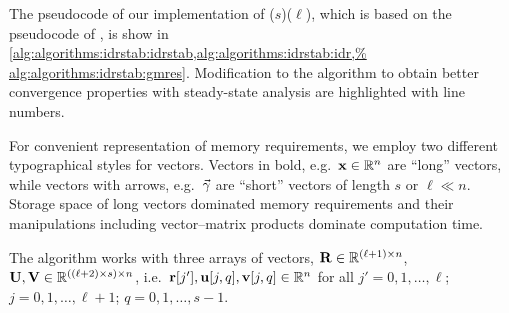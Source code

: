The pseudocode of our implementation of
($s$)($\ell$), which is based on the
pseudocode of \citet{sleijpen2010exploiting}, is show in
\cref{alg:algorithms:idrstab:idrstab,alg:algorithms:idrstab:idr,%
alg:algorithms:idrstab:gmres}. Modification to the algorithm to obtain
better convergence properties with  steady-state analysis
are highlighted with  line numbers.

For convenient representation of memory requirements, we employ two
different typographical styles for vectors. Vectors in bold,
e.g.~$\bm{\mathrm{x}} \in \mathbb{R}^n$ are ``long'' vectors, while vectors with
arrows, e.g.~$\vecarrow{\gamma}$ are ``short'' vectors of length $s$
or $\ell \ll n$. Storage space of long vectors dominated memory
requirements and their manipulations including vector--matrix products
dominate computation time.

The algorithm works with three arrays of vectors,
$\bm{\mathrm{R}} \in \mathbb{R}^{(\ell + 1) \times n}$,
$\bm{\mathrm{U}}, \bm{\mathrm{V}} \in \mathbb{R}^{((\ell + 2) \times s) \times n}$,
i.e.~$\bm{\mathrm{r}}[j'], \bm{\mathrm{u}}[j, q], \bm{\mathrm{v}}[j, q] \in \mathbb{R}^n$ for all
$j' = 0, 1, \ldots, \ell$; $j = 0, 1, \ldots, \ell + 1$;
$q = 0, 1, \ldots, s - 1$.

